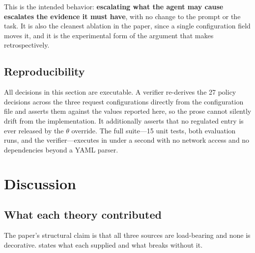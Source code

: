 \documentclass[conference,compsoc]{IEEEtran}
\begin{document}
This is the intended behavior: \textbf{escalating what the agent may cause
escalates the evidence it must have}, with no change to the prompt or the task.
It is also the cleanest ablation in the paper, since a single configuration
field moves it, and it is the experimental form of the argument that
 makes retrospectively.

\subsection{Reproducibility}

All decisions in this section are executable. A verifier re-derives the
27 policy decisions across the three request configurations directly from the
configuration file and asserts them against the values reported here, so the
prose cannot silently drift from the implementation. It additionally asserts
that no regulated entry is ever released by the $\theta$ override. The full
suite---15 unit tests, both evaluation runs, and the verifier---executes in
under a second with no network access and no dependencies beyond a YAML
parser.
\section{Discussion}
\label{sec:discussion}

\subsection{What each theory contributed}

The paper's structural claim is that all three sources are load-bearing and
none is decorative.  states what each supplied and what
breaks without it.
\end{document}
